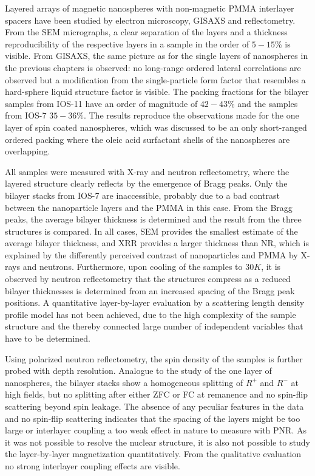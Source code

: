 \documentclass[\main/dresen_thesis.tex]{subfiles}
\begin{document}
  \label{sec:looselyPackedNS:bilayerStacks:summary}
  Layered arrays of magnetic nanospheres with non-magnetic PMMA interlayer spacers have been studied by electron microscopy, GISAXS and reflectometry.
  From the SEM micrographs, a clear separation of the layers and a thickness reproducibility of the respective layers in a sample in the order of $5 - 15 \%$ is visible.
  From GISAXS, the same picture as for the single layers of nanospheres in the previous chapters is observed: no long-range ordered lateral correlations are observed but a modification from the single-particle form factor that resembles a hard-sphere liquid structure factor is visible.
  The packing fractions for the bilayer samples from IOS-11 have an order of magnitude of $42 - 43 \%$ and the samples from IOS-7 $35 - 36 \%$.
  The results reproduce the observations made for the one layer of spin coated nanospheres, which was discussed to be an only short-ranged ordered packing where the oleic acid surfactant shells of the nanospheres are overlapping.

  All samples were measured with X-ray and neutron reflectometry, where the layered structure clearly reflects by the emergence of Bragg peaks.
  Only the bilayer stacks from IOS-7 are inaccessible, probably due to a bad contrast between the nanoparticle layers and the PMMA in this case.
  From the Bragg peaks, the average bilayer thickness is determined and the result from the three structures is compared.
  In all cases, SEM provides the smallest estimate of the average bilayer thickness, and XRR provides a larger thickness than NR, which is explained by the differently perceived contrast of nanoparticles and PMMA by X-rays and neutrons.
  Furthermore, upon cooling of the samples to $30 \unit{K}$, it is observed by neutron reflectometry that the structures compress as a reduced bilayer thicknesses is determined from an increased spacing of the Bragg peak positions.
  A quantitative layer-by-layer evaluation by a scattering length density profile model has not been achieved, due to the high complexity of the sample structure and the thereby connected large number of independent variables that have to be determined.

  Using polarized neutron reflectometry, the spin density of the samples is further probed with depth resolution.
  Analogue to the study of the one layer of nanospheres, the bilayer stacks show a homogeneous splitting of $R^{+}$ and $R^{-}$ at high fields, but no splitting after either ZFC or FC at remanence and no spin-flip scattering beyond spin leakage.
  The absence of any peculiar features in the data and no spin-flip scattering indicates that the spacing of the layers might be too large or interlayer coupling a too weak effect in nature to measure with PNR.
  As it was not possible to resolve the nuclear structure, it is also not possible to study the layer-by-layer magnetization quantitatively.
  From the qualitative evaluation no strong interlayer coupling effects are visible.
\end{document}
